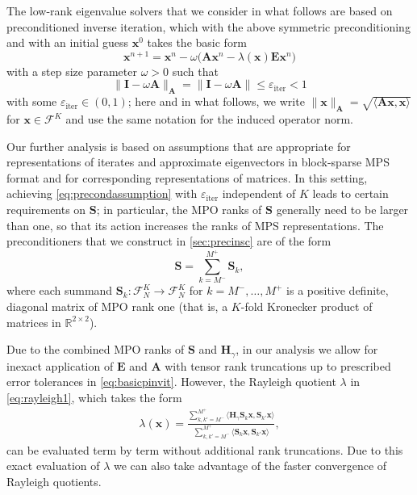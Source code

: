 \documentclass[a4paper,11pt,oneside]{amsart}
\providecommand{\norm}[1]{\lVert#1\rVert}
\theoremstyle{definition}
\theoremstyle{remark}
\newcommand{\A}{\ten A}
\newcommand{\E}{\ten E}
\newcommand{\R}{\mathbb{R}}
\newcommand{\ten}[1]{\boldsymbol{#1}}
\newcommand{\eiter}{\ensuremath{\varepsilon_{\mathrm{iter}}}}
\numberwithin{equation}{section}
\numberwithin{theorem}{section}
\begin{document}
The low-rank eigenvalue solvers that we consider in what follows are based on preconditioned inverse iteration, which with the above symmetric preconditioning and with an initial guess $\ten x^0$ takes the basic form
\begin{equation}\label{eq:basicpinvit}
   \ten x^{n+1}  = \ten x^n - \omega  \bigl(   \A \ten x^n - \lambda(\ten x) \E \ten x^n  \bigr) 
\end{equation} 
with a step size parameter $\omega> 0$ such that 
\begin{equation}\label{eq:precondassumption}
 \norm{ \ten I - \omega  \A  }_{\A} =  \norm{ \ten I - \omega  \A  } \leq \eiter < 1
\end{equation}
with some $\eiter  \in (0,1)$; here and in what follows, we write $\norm{\ten x}_{\ten A} = \sqrt{\langle \ten A \ten x, \ten x\rangle}$ for $\ten x \in \mathcal F^K$ and use the same notation for the induced operator norm.

Our further analysis is based on assumptions that are appropriate for representations of iterates and approximate eigenvectors in block-sparse MPS format and for corresponding representations of matrices. In this setting, achieving \eqref{eq:precondassumption} with $\eiter$ independent of $K$ leads to certain requirements on $\ten S$; in particular, the MPO ranks of $\ten S$ generally need to be larger than one, so that its action increases the ranks of MPS representations. The preconditioners that we construct in \cref{sec:precinsc} are of the form
\[ \ten S = \sum_{k=M^-}^{M^+} \ten S_k ,  \]
where each summand $\ten S_k: \mathcal{F}_N^K \rightarrow \mathcal{F}_N^K$ for $k = M^-,\ldots,M^+$ is a positive definite, diagonal matrix of MPO rank one (that is, a $K$-fold Kronecker product of matrices in $\R^{2\times 2}$).


Due to the combined MPO ranks of $\ten S$ and $\ten H_\gamma$, in our analysis we allow for inexact application of $\E$ and $\A$ with tensor rank truncations up to prescribed error tolerances in \eqref{eq:basicpinvit}.
However, the Rayleigh quotient $\lambda$ in \cref{eq:rayleigh1}, which takes the form
\begin{align}\label{exactrq}
 		\lambda(\ten x) = \frac{\displaystyle\sum_{k,k' = M^-}^{M^+} \langle \ten{H}_\gamma  \ten S_k \ten x, \ten S_{k'} \ten x\rangle}{\displaystyle\sum_{k,k' = M^-}^{M^+} \langle \ten S_k \ten x, \ten S_{k'} \ten x \rangle},
\end{align}
can be evaluated term by term without additional rank truncations. Due to this exact evaluation of $\lambda$ we can also take advantage of the faster convergence of Rayleigh quotients.
\end{document}
